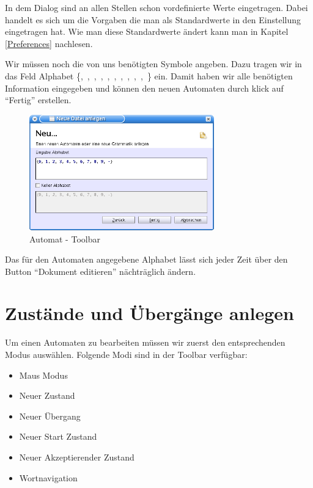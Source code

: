 In dem Dialog sind an allen Stellen schon vordefinierte Werte eingetragen. Dabei
handelt es sich um die Vorgaben die man als Standardwerte in den Einstellung
eingetragen hat. Wie man diese Standardwerte ändert kann man in Kapitel
\ref{Preferences} nachlesen.\vspace{10pt}

Wir müssen noch die von uns benötigten Symbole angeben. Dazu tragen wir in das
Feld Alphabet \{,\ ,\ ,\ ,\
,\ ,\ ,\ ,\ ,\ ,\
\Symbol{-}\} ein. Damit haben wir alle benötigten Information eingegeben und
können den neuen Automaten durch klick auf "`Fertig"' erstellen.\vspace{10pt}
\vspace{10pt} 

\begin{figure}[h]
\begin{center}
\includegraphics[width=8cm]{images/new_dialog_machine.png}
\caption{Automat - Toolbar}
\end{center}
\end{figure}

Das für den Automaten angegebene Alphabet lässt sich jeder Zeit über den Button
"`Dokument editieren"' nächträglich ändern.

\section{Zustände und Übergänge anlegen}

Um einen Automaten zu bearbeiten müssen wir zuerst den entsprechenden Modus
auswählen. Folgende Modi sind in der Toolbar verfügbar:

\begin{itemize}
  \item Maus Modus
  \item Neuer Zustand
  \item Neuer Übergang
  \item Neuer Start Zustand
  \item Neuer Akzeptierender Zustand
  \item Wortnavigation
\end{itemize}

